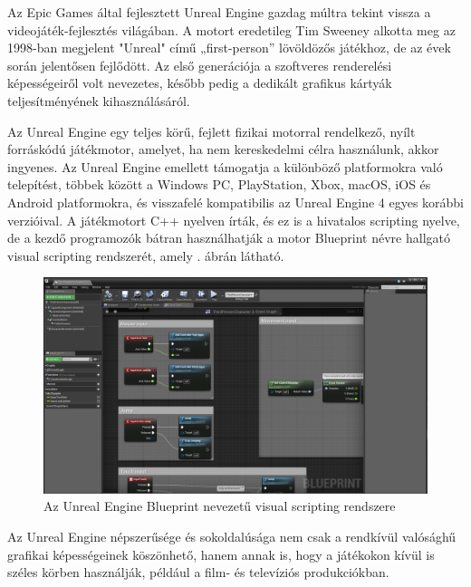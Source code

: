 Az Epic Games által fejlesztett Unreal Engine gazdag múltra tekint vissza a videojáték-fejlesztés világában. A motort eredetileg Tim Sweeney alkotta meg az 1998-ban megjelent "Unreal" című „first-person” lövöldözős játékhoz, de az évek során jelentősen fejlődött. Az első generációja a szoftveres renderelési képességeiről volt nevezetes, később pedig a dedikált grafikus kártyák teljesítményének kihasználásáról. \cite{unrealengine1}

Az Unreal Engine egy teljes körű, fejlett fizikai motorral rendelkező, nyílt forráskódú játékmotor, amelyet, ha nem kereskedelmi célra használunk, akkor ingyenes. Az Unreal Engine emellett támogatja a különböző platformokra való telepítést, többek között a Windows PC, PlayStation, Xbox, macOS, iOS és Android platformokra, és visszafelé kompatibilis az Unreal Engine 4 egyes korábbi verzióival. A játékmotort C++ nyelven írták, és ez is a hivatalos scripting nyelve, de a kezdő programozók bátran használhatják a motor Blueprint névre hallgató visual scripting rendszerét, amely . ábrán látható. \cite{unrealengine1}

\begin{figure}[ht]
\centering
\includegraphics[scale = 0.2]{images/blueprinteditor_windows.png}
\caption{Az Unreal Engine Blueprint nevezetű visual scripting rendszere \cite{unrealengine2}}
\label{fig:unrealblueprint}
\end{figure}

Az Unreal Engine népszerűsége és sokoldalúsága nem csak a rendkívül valósághű grafikai képességeinek köszönhető, hanem annak is, hogy a játékokon kívül is széles körben használják, például a film- és televíziós produkciókban.



